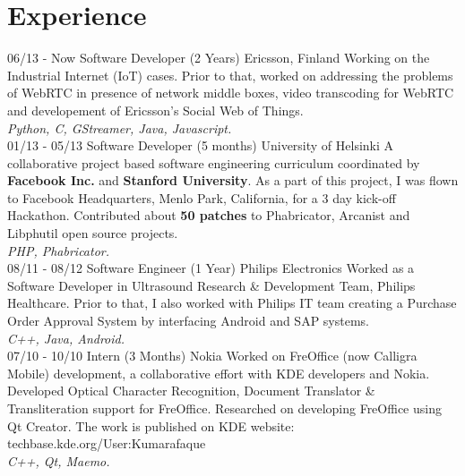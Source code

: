 \documentclass[]{friggeri-cv}
\begin{document}
\section{Experience}
\begin{entrylist}
  \entry
    {06/13 - Now}
    {Software Developer (2 Years)}
    {\Large{Ericsson, Finland}}
    { Working on the Industrial Internet (IoT) cases. Prior to that, worked on addressing the problems of WebRTC in presence of network middle boxes, video transcoding for WebRTC and developement of Ericsson's Social Web of Things. \\
    {\emph{Python, C, GStreamer, Java, Javascript.}\\}}
  \entry
    {01/13 - 05/13}
    {Software Developer (5 months)}
    {\Large{University of Helsinki}}
    {A collaborative project based software engineering curriculum coordinated by \textbf{Facebook Inc.} and \textbf{Stanford University}. As a part of this project, I was flown to Facebook Headquarters, Menlo Park, California, for a 3 day kick-off Hackathon. Contributed about \textbf{50 patches} to Phabricator, Arcanist and Libphutil open source projects.\\
    \emph{PHP, Phabricator.}\\}
    \entry
    {08/11 - 08/12}
    {Software Engineer (1 Year)}
    {\Large{Philips Electronics}}
    {Worked as a Software Developer in Ultrasound Research \& Development Team, Philips Healthcare. Prior to that, I also worked with Philips IT team creating a Purchase Order Approval System by interfacing Android and SAP systems.\\
    \emph{C++, Java, Android.}\\}
    \entry
    {07/10 - 10/10}
    {Intern  (3 Months)}
    {\Large{Nokia}}
    {Worked on FreOffice (now Calligra Mobile) development, a collaborative effort with KDE developers and Nokia. Developed Optical Character Recognition, Document Translator \& Transliteration support for FreOffice. Researched on developing FreOffice using Qt Creator. The work is published on KDE website: techbase.kde.org/User:Kumarafaque\\
    \emph{C++, Qt, Maemo.}}
\end{entrylist}
\end{document}

